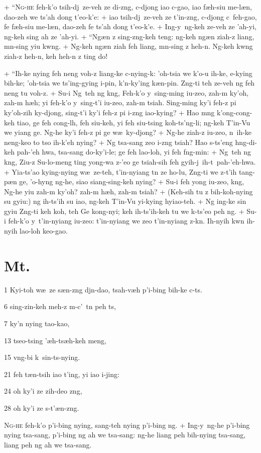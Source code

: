 \par
+	``\textsc{Ng-he} feh-k'o tsih-dj\y\ ze-veh ze di-z\oo ng, c\y-djong iao c\y-gao, iao f\ae h-siu me-l\ae n, dao-zeh we ts'ah dong t'eo-k'e:
+	iao tsih-dj\y\ ze-veh ze t'in-z\oo ng, c\y-djong c\y\ feh-gao, fe f\ae h-siu me-l\ae n, dao-zeh fe ts'ah dong t'eo-k'e.
+	Ing-y\y\ ng-keh ze-veh ze 'ah-yi, ng-keh sing ah ze 'ah-yi.
+	``Ng\ae n z sing-z\oo ng-keh teng: ng-keh ng\ae n ziah-z liang, m\e n-sing yiu kw\oo ng.
+	Ng-keh ng\ae n ziah feh liang, m\e n-sing z heh-\e n. Ng-keh kw\oo ng ziah-z heh-\e n, keh heh-\e n z ting do!
\par
+	``Ih-ke nying feh neng voh-z liang-ke c\y-nying-k\oo: 'oh-tsia we k'o-u ih-ke, e-kying bih-ke; 'oh-tsia we ts'ing-gying i-pin, k'\e n-ky'ing k\ae n-pin. Z\oo ng-ti teh ze-veh ng feh neng tu voh-z.
+	Su-i Ng\oo\ teh ng k\oo ng, Feh-k'o y\y\ sing-ming iu-zeo, zah-m ky'\y oh, zah-m h\ae h; yi feh-k'o y\y\ sing-t'i iu-zeo, zah-m tsiah. Sing-ming ky'i feh-z pi ky'\y oh-zih ky\y-djong, sing-t'i ky'i feh-z pi i-z\oo ng iao-kying?
+	Hao m\oo ng k'ong-cong-keh tiao, ge feh cong-l\oo h, feh siu-keh, yi feh siu-tsing koh-ts'\oo ng-li; ng-keh T'in-Vu we yiang ge. Ng-he ky'i feh-z pi ge w\ae\ ky\y-djong?
+	Ng-he ziah-z iu-zeo, n\oo\ ih-ke neng-keo to tso ih-k'eh nying?
+	Ng tsa-sang zeo i-z\oo ng tsiah? Hao s-ts'eng h\oo ng-di-keh pah-'eh hwa, tsa-sang do-ky'i-le; ge feh lao-loh, yi feh f\oo ng-min:
+	Ng\oo\ teh ng k\oo ng, Ziu-z Su-lo-meng ting y\y ong-wa z-'eo ge tsiah-sih feh gyih-j\y\ ih-t\oo\ pah-'eh-hwa.
+	Yia-ts'ao kying-nying w\ae\ ze-teh, t'in-nyiang t\e n ze ho-lu, Z\oo ng-ti we z-t'ih tang-p\ae n ge, 'o-hy\y\oo ng ng-he, siao siang-sing-keh nying?
+	Su-i feh y\y ong iu-zeo, k\oo ng, Ng\oo-he yiu zah-m ky'\y oh? zah-m h\ae h, zah-m tsiah?
+	(Keh-sih tu z bih-koh-nying su gyiu:) ng ih-ts'ih su iao, ng-keh T'in-Vu yi-kying hyiao-teh.
+	Ng ing-ke sin gyiu Z\oo ng-ti keh koh, teh Ge kong-nyi; keh ih-ts'ih-keh tu we k\oo-ts'eo peh ng.
+	Su-i feh-k'o y\y\ t'in-nyiang iu-zeo: t'in-nyiang we zeo t'in-nyiang z-k\e n. Ih-nyih kw\e n ih-nyih lao-loh keo-gao.



\section{Mt.}%

\begin{sAbstract}
	\item[1] Kyi-toh w\ae\ ze s\ae n-z\oo ng dj\y n-dao, tsah-v\ae h p'i-bing bih-ke c\y-ts.
	\item[6] sing-zin-keh meh-z m-c'\y\ t\e n peh ts,
	\item[7] ky'\y n nying tao-kao,
	\item[13] tseo-tsing '\ae h-ts\ae h-keh meng,
	\item[15] v\oo ng-bi k\oo\ sin-ts-nying.
	\item[21] feh t\ae n-tsih iao t'ing, yi iao i-jing:
	\item[24] oh ky'i ze zih-deo z\oo ng,
	\item[28] oh ky'i ze s\oo-t'\ae n-z\oo ng. 
\end{sAbstract}

\header
\lettrine{N}{g-he} feh-k'o p'i-bing nying, sang-teh nying p'i-bing ng.
+	Ing-y\y\ ng-he p'i-bing nying tsa-sang, p'i-bing ng ah we tsa-sang: ng-he liang peh bih-nying tsa-sang, liang peh ng ah we tsa-sang.